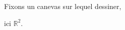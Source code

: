 \documentclass[preview]{standalone}
\begin{document}
\begin{center}
Fixons un canevas sur lequel dessiner,
        
 ici $\mathbb{R}^2$.
\end{center}
\end{document}
